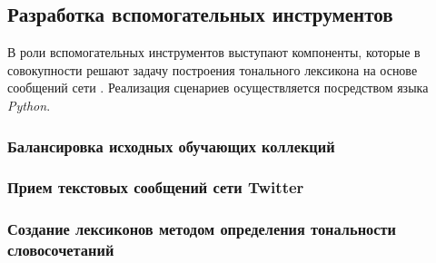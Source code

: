 \subsection{Разработка вспомогательных инструментов}
В роли вспомогательных инструментов выступают компоненты, которые в совокупности
решают задачу построения тонального лексикона на основе сообщений сети \twitter.
Реализация сценариев осуществляется посредством языка {\it Python}.

    \subsubsection{Балансировка исходных обучающих коллекций}

    \subsubsection{Прием текстовых сообщений сети Twitter}

    \subsubsection{Создание лексиконов методом определения тональности словосочетаний}

